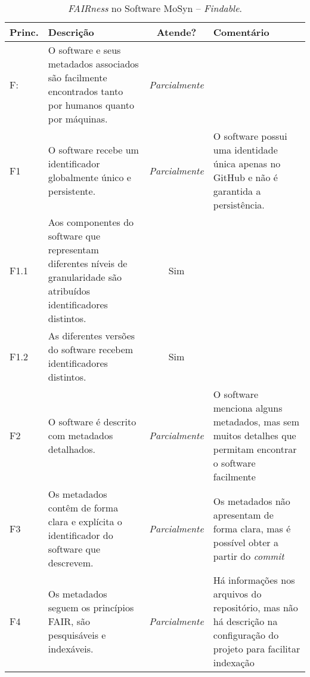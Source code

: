 
\begin{table}[tb]
    \caption{\textit{FAIRness} no Software MoSyn -- \textit{Findable}.}
    \centering
    \small
    \begin{tabular}{p{0.9cm}|p{5cm}|c|p{5.25cm}}
    \hline
    Princ. & Descrição & Atende? & Comentário 
    \\ \hline
     F: & O software e seus metadados associados são facilmente encontrados tanto por humanos quanto por máquinas. & \textit{Parcialmente} &  \\
     F1 & O software recebe um identificador globalmente único e persistente. & \textit{Parcialmente} & O software possui uma identidade única apenas no GitHub e não é garantida a persistência. \\
     F1.1 & Aos componentes do software que representam diferentes níveis de granularidade são atribuídos identificadores distintos. & Sim & \\
     F1.2 & As diferentes versões do software recebem identificadores distintos. & Sim & \\ \hline
     F2 & O software é descrito com metadados detalhados. & \textit{Parcialmente} & O software menciona alguns metadados, mas sem muitos detalhes que permitam encontrar o software facilmente \\
     F3 & Os metadados contêm de forma clara e explícita o identificador do software que descrevem. & \textit{Parcialmente} & Os metadados não apresentam de forma clara, mas é possível obter a partir do \textit{commit} \\
     F4 & Os metadados seguem os princípios FAIR, são pesquisáveis e indexáveis. & \textit{Parcialmente} & Há informações nos arquivos do repositório, mas não há descrição na configuração do projeto para facilitar indexação \\
      \hline
    \end{tabular} \label{tab:fairness:garcia:f}
\end{table}

